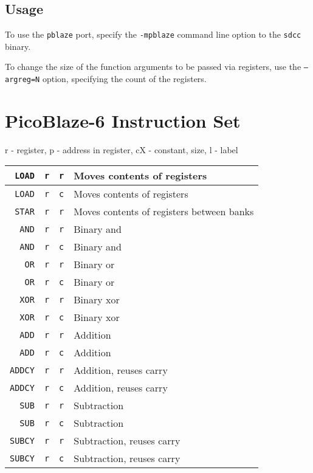 \section{Usage}

To use the \texttt{pblaze} port, specify the \texttt{-mpblaze} command line option to the \texttt{sdcc} binary.

To change the size of the function arguments to be passed via registers, use the \texttt{--argreg=N} option, specifying the count of the registers.


\chapter{PicoBlaze-6 Instruction Set}\label{instrset}
\begin{table}[H]
\centering
r - register, p - address in register, cX - constant, size, l - label
\begin{tabular}{| r | c | c | l |}\hline

\verb|LOAD|&\verb|r|&\verb|r|& Moves contents of registers\\ \hline
\verb|LOAD|&\verb|r|&\verb|c|& Moves contents of registers\\ \hline
\verb|STAR|&\verb|r|&\verb|r|& Moves contents of registers between banks\\ \hline

\verb|AND|&\verb|r|&\verb|r|& Binary and\\ \hline
\verb|AND|&\verb|r|&\verb|c|& Binary and\\ \hline
\verb|OR|&\verb|r|&\verb|r|& Binary or\\ \hline
\verb|OR|&\verb|r|&\verb|c|& Binary or\\ \hline
\verb|XOR|&\verb|r|&\verb|r|& Binary xor\\ \hline
\verb|XOR|&\verb|r|&\verb|c|& Binary xor\\ \hline

\verb|ADD|&\verb|r|&\verb|r|& Addition\\ \hline
\verb|ADD|&\verb|r|&\verb|c|& Addition\\ \hline
\verb|ADDCY|&\verb|r|&\verb|r|& Addition, reuses carry\\ \hline
\verb|ADDCY|&\verb|r|&\verb|c|& Addition, reuses carry\\ \hline
\verb|SUB|&\verb|r|&\verb|r|& Subtraction\\ \hline
\verb|SUB|&\verb|r|&\verb|c|& Subtraction\\ \hline
\verb|SUBCY|&\verb|r|&\verb|r|& Subtraction, reuses carry\\ \hline
\verb|SUBCY|&\verb|r|&\verb|c|& Subtraction, reuses carry\\ \hline



\end{tabular}
\end{table}
